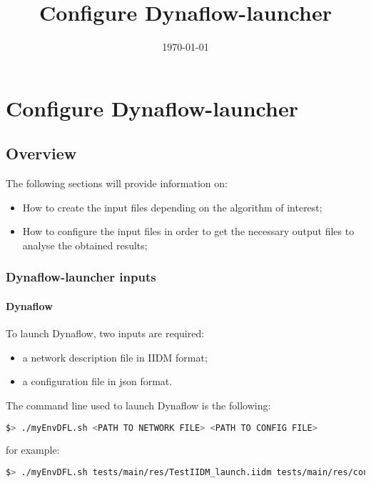 \documentclass[a4paper, 12pt]{report}
\begin{document}
\title{Configure Dynaflow-launcher}
\date\today

\maketitle
\tableofcontents

\chapter[Configure Dynaflow-launcher]{Configure Dynaflow-launcher}

\section{Overview}

The following sections will provide information on:
\begin{itemize}
\item How to create the input files depending on the algorithm of interest;
\item How to configure the input files in order to get the necessary output files to analyse the obtained results;
\end{itemize}


\subsection[Dynaflow-launcher inputs]{Dynaflow-launcher inputs}
\subsubsection{Dynaflow}

To launch Dynaflow, two inputs are required:
\begin{itemize}
  \item a network description file in IIDM format;
  \item a configuration file in json format.
\end{itemize}

The command line used to launch Dynaflow is the following:

\begin{lstlisting}[language=bash, breaklines=true, breakatwhitespace=false, columns=fullflexible]
$> ./myEnvDFL.sh <PATH TO NETWORK FILE> <PATH TO CONFIG FILE>
\end{lstlisting}

for example:

\begin{lstlisting}[language=bash, breaklines=true, breakatwhitespace=false, columns=fullflexible]
$> ./myEnvDFL.sh tests/main/res/TestIIDM_launch.iidm tests/main/res/config_launch.json
\end{lstlisting}
\end{document}
